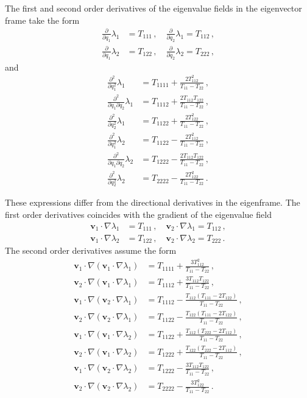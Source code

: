 \documentclass[a4paper, 11pt]{article}
\begin{document}
The first and second order derivatives of the eigenvalue fields in the eigenvector frame take the form
\begin{align}
\frac{\partial}{\partial q_1} \lambda_1&= T_{111}\,,\quad
\frac{\partial}{\partial q_2} \lambda_1= T_{112}\,,\\
\frac{\partial}{\partial q_1} \lambda_2&= T_{122}\,,\quad
\frac{\partial}{\partial q_2} \lambda_2= T_{222}\,,
\end{align}
and 
\begin{align}
\frac{\partial^2}{\partial q_1^2} \lambda_1&= T_{1111} + \frac{2 T_{112}^2}{T_{11}-T_{22}}\,,\\
\frac{\partial^2}{\partial q_1 \partial q_2} \lambda_1&= T_{1112} + \frac{2 T_{112}T_{122}}{T_{11}-T_{22}}\,,\\
\frac{\partial^2}{\partial q_2^2} \lambda_1&= T_{1122} + \frac{2T_{122}^2}{T_{11}-T_{22}}\,,\\
\frac{\partial^2}{\partial q_1^2} \lambda_2&= T_{1122} - \frac{2 T_{112}^2}{T_{11}-T_{22}}\,,\\
\frac{\partial^2}{\partial q_1 \partial q_2} \lambda_2&= T_{1222} - \frac{2 T_{112}T_{122}}{T_{11}-T_{22}}\,,\\
\frac{\partial^2}{\partial q_2^2} \lambda_2&= T_{2222} - \frac{2T_{122}^2}{T_{11}-T_{22}}\,.
\end{align}

These expressions differ from the directional derivatives in the eigenframe. The first order derivatives coincides with the gradient of the eigenvalue field
\begin{align}
\bm{v}_1 \cdot \nabla \lambda_1 &= T_{111}\,,\quad
\bm{v}_2 \cdot \nabla \lambda_1 = T_{112}\,,\\
\bm{v}_1 \cdot \nabla \lambda_2 &= T_{122}\,,\quad
\bm{v}_2 \cdot \nabla \lambda_2 = T_{222}\,.
\end{align}
The second order derivatives assume the form
\begin{align}
\bm{v}_1 \cdot \nabla (\bm{v}_1 \cdot \nabla \lambda_1) &= T_{1111} + \frac{3T_{112}^2}{T_{11}-T_{22}}\,,\\
\bm{v}_2 \cdot \nabla (\bm{v}_1 \cdot \nabla \lambda_1) &= T_{1112} + \frac{3T_{112}T_{122}}{T_{11}-T_{22}}\,,\\
\bm{v}_1 \cdot \nabla (\bm{v}_2 \cdot \nabla \lambda_1) &= T_{1112} - \frac{T_{112}(T_{111}-2T_{122})}{T_{11}-T_{22}}\,,\\
\bm{v}_2 \cdot \nabla (\bm{v}_2 \cdot \nabla \lambda_1) &= T_{1122} - \frac{T_{122}(T_{111}-2T_{122})}{T_{11}-T_{22}}\,,\\
\bm{v}_1 \cdot \nabla (\bm{v}_1 \cdot \nabla \lambda_2) &= T_{1122} + \frac{T_{112}(T_{222}-2T_{112})}{T_{11}-T_{22}}\,,\\
\bm{v}_2 \cdot \nabla (\bm{v}_1 \cdot \nabla \lambda_2) &= T_{1222} + \frac{T_{122}(T_{222}-2T_{112})}{T_{11}-T_{22}}\,,\\
\bm{v}_1 \cdot \nabla (\bm{v}_2 \cdot \nabla \lambda_2) &= T_{1222} - \frac{3T_{112}T_{122}}{T_{11}-T_{22}}\,,\\
\bm{v}_2 \cdot \nabla (\bm{v}_2 \cdot \nabla \lambda_2) &= T_{2222} - \frac{3T_{122}^2}{T_{11}-T_{22}}\,.
\end{align}
\end{document}
